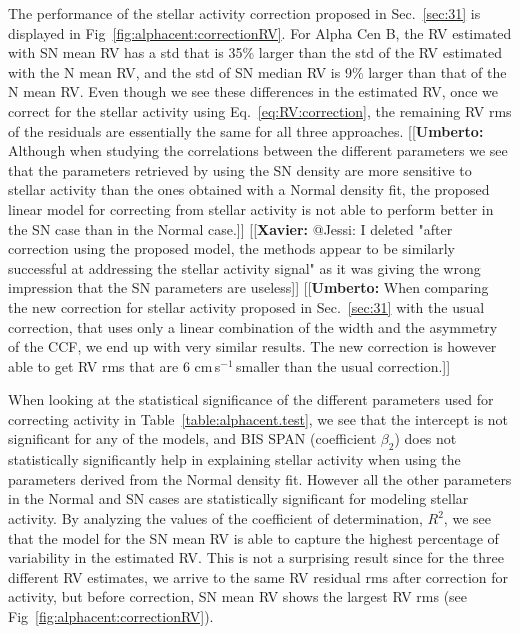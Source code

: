 \documentclass{aa}
\def\cms{\hbox{\,cm\,s$^{-1}$}}       %
\newcommand{\xavier}[1]{{\color{blue}[[\textbf{Xavier: }#1]]}}
\newcommand{\umberto}[1]{{\color{green}[[\textbf{Umberto: }#1]]}}
\begin{document}
The performance of the stellar activity correction proposed in Sec.~\ref{sec:31} is displayed in Fig~\ref{fig:alphacent:correctionRV}. 
For Alpha Cen B, the RV estimated with SN mean RV has a std that is 35\% larger than the std of the RV estimated with the N mean RV, and the std of SN median RV is 9\% larger than that of the N mean RV.
Even though we see these differences in the estimated RV, once we correct for the stellar activity using Eq.~\ref{eq:RV:correction}, 
the remaining RV rms of the residuals are essentially the same for all three approaches.
\umberto{Although when studying the correlations between the different parameters we see that the parameters retrieved by using the SN density are more sensitive to stellar activity than the ones obtained with a Normal density fit,
the proposed linear model for correcting from stellar activity is not able to perform better in the SN case than in the Normal case.}
\xavier{@Jessi: I deleted "after correction using the proposed model, the methods appear to be similarly successful at addressing the stellar activity signal" as it was giving the wrong impression that the SN parameters are useless}
\umberto{When comparing the new correction for stellar activity proposed in Sec.~\ref{sec:31} with the usual correction, that uses only a linear combination of the width and the asymmetry of the CCF, we end up with very similar results. The new correction is however able to get RV rms that are 6\,\cms\,smaller than the usual correction.}


When looking at the statistical significance of the different parameters used for correcting activity in Table~\ref{table:alphacent.test}, we see that the intercept is not significant for any of the models, and BIS SPAN (coefficient $\beta_2$) does not statistically significantly help in explaining stellar activity when using the parameters derived from the Normal density fit. 
However all the other parameters in the Normal and SN cases are statistically significant for modeling stellar activity. 
By analyzing the values of the coefficient of determination, $R^2$, we see that the model for the SN mean RV is able to capture the highest percentage of variability in the estimated RV. 
This is not a surprising result since for the three different RV estimates, we arrive to the same RV residual rms after correction for activity, but before correction, SN mean RV shows the largest RV rms (see Fig~\ref{fig:alphacent:correctionRV}).
\end{document}
